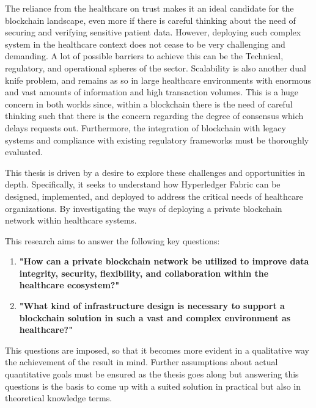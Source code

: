 The reliance from the healthcare on trust makes it an ideal candidate for the blockchain landscape, even more if there is careful thinking about the need of securing and verifying sensitive patient data. However, deploying such complex system in the healthcare context does not cease to be very challenging and demanding. A lot of possible barriers to achieve this can be the Technical, regulatory, and operational spheres of the sector. Scalability is also another dual knife problem, and remains as so in large healthcare environments with enormous and vast amounts of information and high transaction volumes. This is a huge concern in both worlds since, within a blockchain there is the need of careful thinking such that there is the concern regarding the degree of consensus which delays requests out. Furthermore, the integration of blockchain with legacy systems and compliance with existing regulatory frameworks must be thoroughly evaluated.

This thesis is driven by a desire to explore these challenges and opportunities in depth. Specifically, it seeks to understand how Hyperledger Fabric can be designed, implemented, and deployed to address the critical needs of healthcare organizations. By investigating the ways of deploying a private blockchain network within healthcare systems.

This research aims to answer the following key questions:
\begin{enumerate}
\item \textbf{"How can a private blockchain network be utilized to improve data integrity, security, flexibility, and collaboration within the healthcare ecosystem?"}
\item \textbf{"What kind of infrastructure design is necessary to support a blockchain solution in such a vast and complex environment as healthcare?"}
\end{enumerate}

This questions are imposed, so that it becomes more evident in a qualitative way the achievement of the result in mind. Further assumptions about actual quantitative goals must be ensured as the thesis goes along but answering this questions is the basis to come up with a suited solution in practical but also in theoretical knowledge terms.

